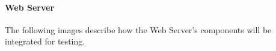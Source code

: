 \documentclass{article}
\begin{document}
\paragraph{Web Server}
The following images describe how the Web Server's 
components will be integrated for testing.
\begin{figure}[H]
\end{figure}
\begin{figure}[H]
\end{figure}
\end{document}
